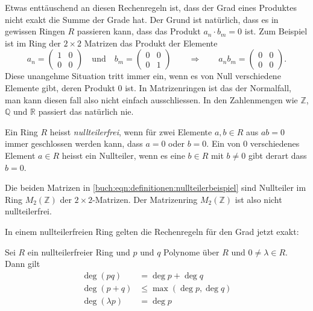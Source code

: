 Etwas enttäuschend an diesen Rechenregeln ist, dass der Grad eines
Produktes nicht exakt die Summe der Grade hat.
Der Grund ist natürlich, dass es in gewissen Ringen $R$ passieren kann,
dass das Produkt $a_n\cdot b_m=0$ ist.
Zum Beispiel ist im Ring der $2\times 2$ Matrizen das Produkt der Elemente
\begin{equation}
a_n = \begin{pmatrix}1&0\\0&0\end{pmatrix}
\quad\text{und}\quad
b_m = \begin{pmatrix}0&0\\0&1\end{pmatrix}
\qquad\Rightarrow\qquad
a_nb_m = \begin{pmatrix}0&0\\0&0\end{pmatrix}.
\label{buch:eqn:definitionen:nullteilerbeispiel}
\end{equation}
Diese unangehme Situation tritt immer ein, wenn es von Null verschiedene
Elemente gibt, deren Produkt $0$ ist.
In Matrizenringen ist das der Normalfall, man kann diesen fall also nicht
einfach ausschliessen.
In den Zahlenmengen wie $\mathbb{Z}$, $\mathbb{Q}$ und $\mathbb{R}$ passiert
das natürlich nie.

\begin{definition}
Ein Ring $R$ heisst {\em nullteilerfrei}, wenn für zwei Elemente
$a,b\in R$ aus $ab=0$ immer geschlossen werden kann, dass
$a=0$ oder $b=0$.
Ein von $0$ verschiedenes Element $a\in R$ heisst ein Nullteiler,
wenn es eine $b\in R$ mit $b\ne 0$ gibt derart dass $b=0$.
\end{definition}

Die beiden Matrizen in 
\eqref{buch:eqn:definitionen:nullteilerbeispiel}
sind Nullteiler im Ring $M_2(\mathbb{Z})$ der $2\times 2$-Matrizen.
Der Matrizenring $M_2(\mathbb{Z})$ ist also nicht nullteilerfrei.

In einem nullteilerfreien Ring gelten die Rechenregeln für den Grad
jetzt exakt:

\begin{lemma}
Sei $R$ ein nullteilerfreier Ring und $p$ und $q$ Polynome über $R$
und $0\ne \lambda\in R$.
Dann gilt
\begin{align}
\deg(pq) &= \deg p + \deg q
\label{buch:eqn:polynome:gradsummeexakt}
\\
\deg(p+q) &\le \max(\deg p, \deg q)
\label{buch:eqn:polynome:gradproduktexakt}
\\
\deg(\lambda p) &= \deg p
\label{buch:eqn:polynome:gradskalarexakt}
\end{align}
\end{lemma}

